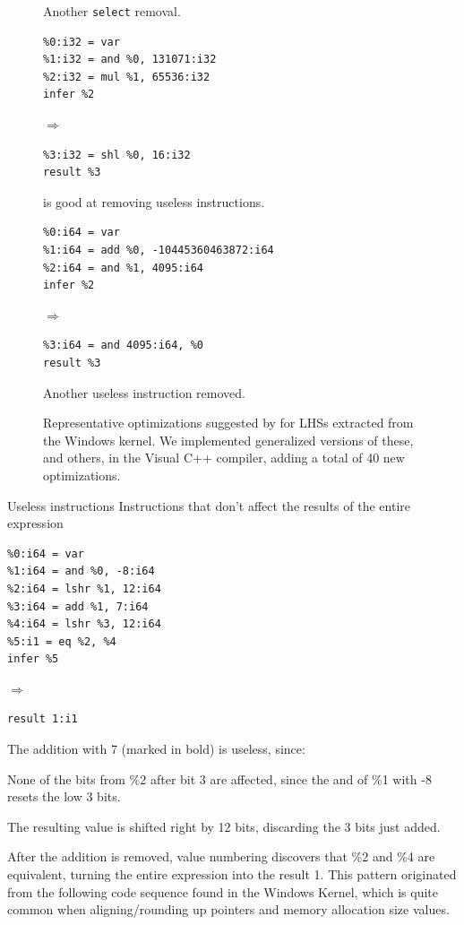 \begin{figure}
{\begin{minipage}[t]{0.31\textwidth}
Another \texttt{select} removal.

\myrule
{\begin{verbatim}
%0:i32 = var
%1:i32 = and %0, 131071:i32
%2:i32 = mul %1, 65536:i32
infer %2
\end{verbatim}}
$\Rightarrow$
{\begin{verbatim}
%3:i32 = shl %0, 16:i32
result %3
\end{verbatim}}

\tool{} is good at removing useless instructions.

\myrule
{\begin{verbatim}
%0:i64 = var
%1:i64 = add %0, -10445360463872:i64
%2:i64 = and %1, 4095:i64
infer %2
\end{verbatim}}
$\Rightarrow$
{\begin{verbatim}
%3:i64 = and 4095:i64, %0
result %3
\end{verbatim}}

Another useless instruction removed.

\end{minipage}

}

\vskip 0.3in

\caption{Representative optimizations suggested by \tool{} for LHSs
  extracted from the Windows kernel. We implemented generalized
  versions of these, and others, in the Visual C++ compiler, adding a
  total of 40 new optimizations.}
\label{fig:windows}
\end{figure}



\iffalse
Useless instructions
Instructions that don’t affect the results of the entire expression

{\begin{verbatim}
%0:i64 = var
%1:i64 = and %0, -8:i64
%2:i64 = lshr %1, 12:i64
%3:i64 = add %1, 7:i64
%4:i64 = lshr %3, 12:i64
%5:i1 = eq %2, %4
infer %5
\end{verbatim}}
$\Rightarrow$
{\begin{verbatim}
result 1:i1
\end{verbatim}}

The addition with 7 (marked in bold) is useless, since:

None of the bits from \%2 after bit 3 are affected, since the and
of \%1 with -8 resets the low 3 bits.

The resulting value is shifted right by 12 bits, discarding the 3 bits just added.

After the addition is removed, value numbering discovers that \%2
and \%4 are equivalent, turning the entire expression into the result
1. This pattern originated from the following code sequence found in
the Windows Kernel, which is quite common when aligning/rounding up
pointers and memory allocation size values.

